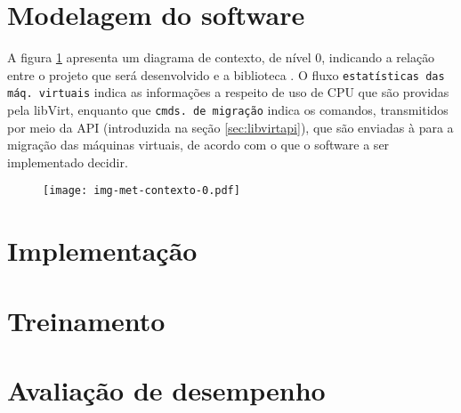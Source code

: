 
\section{Modelagem do software}

A figura \ref{fig:contexto0} apresenta um diagrama de contexto, de nível 0,
indicando a relação entre o projeto que será desenvolvido e a biblioteca
\libvirt{}. O fluxo \texttt{estatísticas das máq. virtuais} indica as
informações a respeito de uso de CPU que são providas pela libVirt,
enquanto que \texttt{cmds. de migração} indica os comandos, transmitidos
por meio da API (introduzida na seção \ref{sec:libvirtapi}), que são enviadas
à \libvirt{} para a migração das máquinas virtuais, de acordo com o que o
software a ser implementado decidir.

\begin{figure}
\centering
\texttt{[image: img-met-contexto-0.pdf]}
\label{fig:contexto0}
\end{figure}


\section{Implementação}


\section{Treinamento}

\section{Avaliação de desempenho}\label{sec:desemp}

